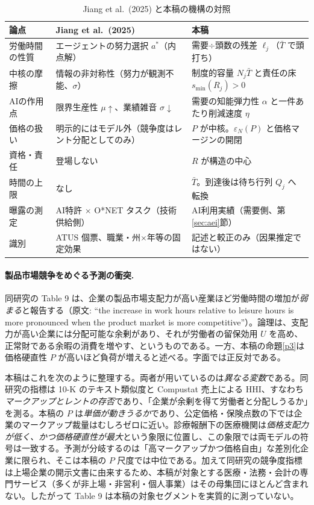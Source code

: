 \documentclass[11pt]{article}
\theoremstyle{plain}
\theoremstyle{definition}
\theoremstyle{remark}
\begin{document}
\begin{table}[t]\centering\small
\caption{Jiang et al.\ (2025) と本稿の機構の対照}\label{tab:jiang}
\begin{tabularx}{\textwidth}{@{}lXX@{}}
\toprule
論点 & Jiang et al.\ (2025) & 本稿 \\ \midrule
労働時間の性質 & エージェントの努力選択 $a^{*}$（内点解） & 需要$\div$頭数の残差 $\ell_j$（$\bar T$ で頭打ち） \\
中核の摩擦 & 情報の非対称性（努力が観測不能、$\sigma$） & 制度的容量 $N_j\bar T$ と責任の床 $s_{\min}(R_j)>0$ \\
AIの作用点 & 限界生産性 $\mu\uparrow$、業績雑音 $\sigma\downarrow$ & 需要の知能弾力性 $\alpha$ と一件あたり削減速度 $\eta$ \\
価格の扱い & 明示的にはモデル外（競争度はレント分配としてのみ） & $P$ が中核。$\varepsilon_N(P)$ と価格マージンの開閉 \\
資格・責任 & 登場しない & $R$ が構造の中心 \\
時間の上限 & なし & $\bar T$。到達後は待ち行列 $Q_j$ へ転換 \\
曝露の測定 & AI特許 $\times$ O*NET タスク（技術供給側） & AI利用実績（需要側、第\ref{sec:aei}節） \\
識別 & ATUS 個票、職業・州$\times$年等の固定効果 & 記述と較正のみ（因果推定ではない） \\
\bottomrule
\end{tabularx}
\end{table}

\paragraph{製品市場競争をめぐる予測の衝突.}
同研究の Table 9 は、企業の製品市場支配力が高い産業ほど労働時間の増加が\emph{弱まる}と報告する（原文: ``the increase in work hours relative to leisure hours is more pronounced when the product market is more competitive''）。論理は、支配力が高い企業には分配可能な余剰があり、それが労働者の留保効用 $U$ を高め、正常財である余暇の消費を増やす、というものである。一方、本稿の命題\ref{p3}は価格硬直性 $P$ が高いほど負荷が増えると述べる。字面では正反対である。

本稿はこれを次のように整理する。両者が用いているのは\emph{異なる変数}である。同研究の指標は 10-K のテキスト類似度と Compustat 売上による HHI、すなわち\emph{マークアップとレントの存否}であり、「企業が余剰を得て労働者と分配しうるか」を測る。本稿の $P$ は\emph{単価が動きうるか}であり、公定価格・保険点数の下では企業のマークアップ裁量はむしろゼロに近い。診療報酬下の医療機関は\emph{価格支配力が低く、かつ価格硬直性が最大}という象限に位置し、この象限では両モデルの符号は一致する。予測が分岐するのは「高マークアップかつ価格自由」な差別化企業に限られ、そこは本稿の $P$ 尺度では中位である。加えて同研究の競争度指標は上場企業の開示文書に由来するため、本稿が対象とする医療・法務・会計の専門サービス（多くが非上場・非営利・個人事業）はその母集団にほとんど含まれない。したがって Table 9 は本稿の対象セグメントを実質的に測っていない。
\end{document}
